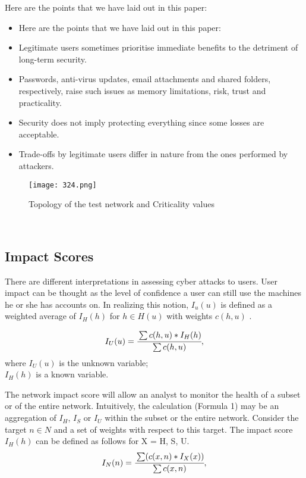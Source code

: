 \documentclass{ledger}
\begin{document}
Here are the points that we have laid out in this paper:
\begin{itemize}
    \item Here are the points that we have laid out in this paper:
    \item Legitimate users sometimes prioritise immediate benefits to the detriment of long-term security. 
    \item Passwords, anti-virus updates, email attachments and shared folders, respectively, raise such issues as memory limitations, risk, trust and practicality. 
    \item Security does not imply protecting everything since some losses are acceptable.  
    \item Trade-offs by legitimate users differ in nature from the ones performed by attackers. 
\end{itemize}
    


\begin{figure}[H]
    \centering
    \texttt{[image: 324.png]}
    \caption{Topology of the test network and Criticality values}
    \label{fig2:enter-label}
\end{figure}
\






\subsection{Impact Scores}
There are different interpretations in assessing cyber attacks to users. User impact can be thought as the level of confidence a user can still use the machines he or she has accounts on. In realizing this notion, $I_u(u)$  is defined as a weighted average of $I_H(h)$ for $h \in H(u)$  with weights $c(h, u)$ .

$$ I_U(u)=\cfrac{\sum c(h, u)*I_H(h)}{\sum c(h,u)},$$
where $I_U(u)$ is the unknown variable;\\
$I_H(h)$ is a known variable.

The network impact score will allow an analyst to monitor the health of a subset or of the entire network. Intuitively, the calculation (Formula 1) may be an aggregation of $I_H$, $I_S$ or $I_U$  within the subset or the entire network. Consider the target $n\in N$ and a set of weights with respect to this target. The impact score $I_H(h)$ can be defined as follows for X = H, S, U.
$$ I_N(n)=\cfrac{\sum (c(x, n)*I_X(x))}{\sum c(x,n)},$$
\end{document}
